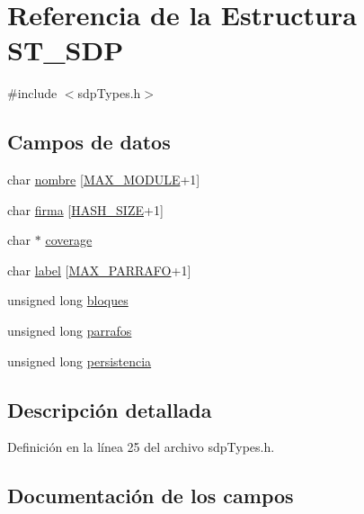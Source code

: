 \hypertarget{struct_s_t___s_d_p}{}\section{Referencia de la Estructura S\+T\+\_\+\+S\+D\+P}
\label{struct_s_t___s_d_p}


{\ttfamily \#include $<$sdp\+Types.\+h$>$}

\subsection*{Campos de datos}
\begin{DoxyCompactItemize}
\item 
char \hyperlink{struct_s_t___s_d_p_a59b9df3193b6f874922b75715fc1bc81}{nombre} \mbox{[}\hyperlink{sdpconfig_8h_a6611b3fba9de26203f14407743b750cc}{M\+A\+X\+\_\+\+M\+O\+D\+U\+L\+E}+1\mbox{]}
\item 
char \hyperlink{struct_s_t___s_d_p_a11de7bbb4add4ed0cf596ea7a05cb841}{firma} \mbox{[}\hyperlink{sdpconfig_8h_ad6074dd11ab3c97c8135c43aab03ae95}{H\+A\+S\+H\+\_\+\+S\+I\+Z\+E}+1\mbox{]}
\item 
char $\ast$ \hyperlink{struct_s_t___s_d_p_a88033942c6a9207d32af22c3f69cc31e}{coverage}
\item 
char \hyperlink{struct_s_t___s_d_p_aa62a205ca9e35b3b88632d2ec557a5a0}{label} \mbox{[}\hyperlink{sdpconfig_8h_ac084a897234f41c71f01eab1d39c3073}{M\+A\+X\+\_\+\+P\+A\+R\+R\+A\+F\+O}+1\mbox{]}
\item 
unsigned long \hyperlink{struct_s_t___s_d_p_a2524760e620af27370f7dbf1a45750a5}{bloques}
\item 
unsigned long \hyperlink{struct_s_t___s_d_p_a00d906c1e1a889fb8b6f26c73b188936}{parrafos}
\item 
unsigned long \hyperlink{struct_s_t___s_d_p_a256f4cda4f61488d2d766c867e813014}{persistencia}
\end{DoxyCompactItemize}


\subsection{Descripción detallada}


Definición en la línea 25 del archivo sdp\+Types.\+h.



\subsection{Documentación de los campos}
\hypertarget{struct_s_t___s_d_p_a2524760e620af27370f7dbf1a45750a5}{}
